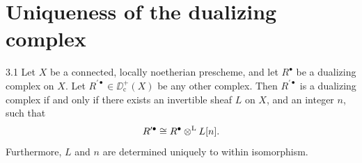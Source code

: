 \par\endgroup

\section{Uniqueness of the dualizing complex}\label{sec:5.3}
\begingroup
\setlength{\emergencystretch}{2em}

\begin{booktheorem}{3.1}\label{thm:5.3.1}
Let $X$ be a connected, locally noetherian prescheme, and let $R^\bullet$ be a dualizing complex on $X$. Let $R^{\prime\bullet}\in\DD_{\mathrm{c}}^+(X)$ be any other complex. Then $R^{\prime\bullet}$ is a dualizing complex if and only if there exists an invertible sheaf $L$ on $X$, and an integer $n$, such that
\[
R^{\prime\bullet}\cong R^\bullet\mathbin{\otimes^{\mathrm{L}}} L[n].
\]
Furthermore, $L$ and $n$ are determined uniquely to within isomorphism.
\end{booktheorem}

